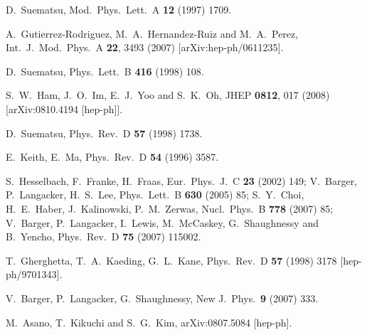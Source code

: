 \documentclass[12pt,a4paper]{article}
\begin{document}
\begin{thebibliography}{999}
D.~Suematsu,
Mod.\ Phys.\ Lett.\  A {\bf 12} (1997) 1709.

A.~Gutierrez-Rodriguez, M.~A.~Hernandez-Ruiz and M.~A.~Perez,
Int.\ J.\ Mod.\ Phys.\  A {\bf 22}, 3493 (2007)
[arXiv:hep-ph/0611235].

D.~Suematsu,
Phys.\ Lett.\  B {\bf 416} (1998) 108.

S.~W.~Ham, J.~O.~Im, E.~J.~Yoo and S.~K.~Oh,
JHEP {\bf 0812}, 017 (2008)
[arXiv:0810.4194 [hep-ph]].

D.~Suematsu,
Phys.\ Rev.\  D {\bf 57} (1998) 1738.

E.~Keith, E.~Ma,
Phys.\ Rev.\  D {\bf 54} (1996) 3587.

S.~Hesselbach, F.~Franke, H.~Fraas,
Eur.\ Phys.\ J.\  C {\bf 23} (2002) 149;
V.~Barger, P.~Langacker, H.~S.~Lee,
Phys.\ Lett.\  B {\bf 630} (2005) 85;
S.~Y.~Choi, H.~E.~Haber, J.~Kalinowski, P.~M.~Zerwas,
Nucl.\ Phys.\  B {\bf 778} (2007) 85;
V.~Barger, P.~Langacker, I.~Lewis, M.~McCaskey, G.~Shaughnessy and B.~Yencho,
Phys.\ Rev.\  D {\bf 75} (2007) 115002.

T.~Gherghetta, T.~A.~Kaeding, G.~L.~Kane,
Phys.\ Rev.\ D {\bf 57} (1998) 3178
[hep-ph/9701343].

V.~Barger, P.~Langacker, G.~Shaughnessy,
New J.\ Phys.\  {\bf 9} (2007) 333.

M.~Asano, T.~Kikuchi and S.~G.~Kim,
arXiv:0807.5084 [hep-ph].


\end{thebibliography}
\end{document}
